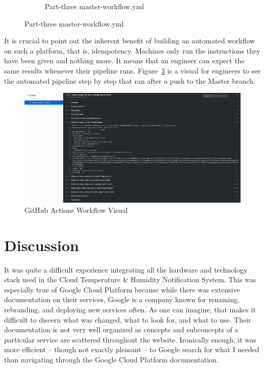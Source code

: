\documentclass{article}
\begin{document}
\begin{figure}[H]
    \begin{figure}[H]
        
        \caption{Part-three master-workflow.yml}
        \label{fig:workflow-file-three}
    \end{figure}
\end{figure}

It is crucial to point out the inherent benefit of building an automated workflow on such a platform, that is, idempotency. Machines only run the instructions they have been given and nothing more. It means that an engineer can expect the same results whenever their pipeline runs. Figure~\ref{fig:workflow-visual} is a visual for engineers to see the automated pipeline step by step that ran after a push to the Master branch.\\

\begin{figure}[H]
    \center
    \includegraphics[width=\textwidth]{images/github-actions.png}
    \caption{GitHub Actions Workflow Visual}
    \label{fig:workflow-visual}
\end{figure}

\section{Discussion}
It was quite a difficult experience integrating all the hardware and technology stack used in the Cloud Temperature \& Humidity Notification System. This was especially true of Google Cloud Platform because while there was extensive documentation on their services, Google is a company known for renaming, rebranding, and deploying new services often. As one can imagine, that makes it difficult to discern what was changed, what to look for, and what to use. Their documentation is not very well organized as concepts and subconcepts of a particular service are scattered throughout the website. Ironically enough, it was more efficient -- though not exactly pleasant -- to Google search for what I needed than navigating through the Google Cloud Platform documentation.\\
\end{document}
